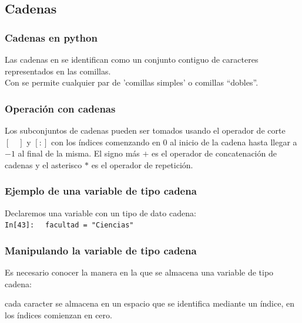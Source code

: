 {\subsection{Cadenas}
\begin{frame}
\frametitle{Cadenas en python}
Las cadenas en \python{} se identifican como un conjunto contiguo de caracteres representados en las comillas.
\\
\bigskip
Con \python{} se permite cualquier par de 'comillas simples' o comillas \enquote{dobles}.
\end{frame}
\begin{frame}
\frametitle{Operación con cadenas}
Los subconjuntos de cadenas pueden ser tomados usando el operador de corte $[ \quad ]$ y $[:]$ con los índices comenzando en $0$ al inicio de la cadena hasta llegar a $-1$ al final de la misma.
\pause
El signo más $+$ es el operador de concatenación de cadenas y el asterisco $*$ es el operador de repetición.
\end{frame}
\begin{frame}[fragile]
\frametitle{Ejemplo de una variable de tipo cadena}
Declaremos una variable con un tipo de dato cadena:
\\
\bigskip
\textcolor{ao}{\texttt{In[43]: }} \verb| facultad = "Ciencias"|
\end{frame}
\begin{frame}
\frametitle{Manipulando la variable de tipo cadena}
Es necesario conocer la manera en la que se almacena una variable de tipo cadena:
\begin{figure}

\end{figure}
cada caracter se almacena en un espacio que se identifica mediante un índice, en \python{} los índices comienzan en cero.



\end{frame}}

